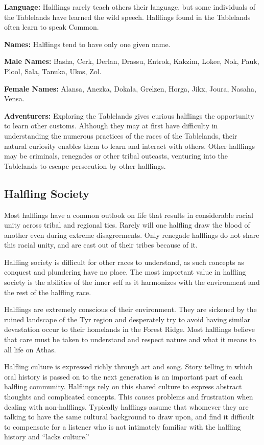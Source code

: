 \textbf{Language:} Halflings rarely teach others their language, but some individuals of the Tablelands have learned the wild speech. Halflings found in the Tablelands often learn to speak Common.

\textbf{Names:} Halflings tend to have only one given name.

\textbf{Male Names:} Basha, Cerk, Derlan, Drassu, Entrok, Kakzim, Lokee, Nok, Pauk, Plool, Sala, Tanuka, Ukos, Zol.

\textbf{Female Names:} Alansa, Anezka, Dokala, Grelzen, Horga, Jikx, Joura, Nasaha, Vensa.

\textbf{Adventurers:} Exploring the Tablelands gives curious halflings the opportunity to learn other customs. Although they may at first have difficulty in understanding the numerous practices of the races of the Tablelands, their natural curiosity enables them to learn and interact with others. Other halflings may be criminals, renegades or other tribal outcasts, venturing into the Tablelands to escape persecution by other halflings.

\subsection{Halfling Society}
Most halflings have a common outlook on life that results in considerable racial unity across tribal and regional ties. Rarely will one halfling draw the blood of another even during extreme disagreements. Only renegade halflings do not share this racial unity, and are cast out of their tribes because of it.

Halfling society is difficult for other races to understand, as such concepts as conquest and plundering have no place. The most important value in halfling society is the abilities of the inner self as it harmonizes with the environment and the rest of the halfling race.

Halflings are extremely conscious of their environment. They are sickened by the ruined landscape of the Tyr region and desperately try to avoid having similar devastation occur to their homelands in the Forest Ridge. Most halflings believe that care must be taken to understand and respect nature and what it means to all life on Athas.

Halfling culture is expressed richly through art and song. Story telling in which oral history is passed on to the next generation is an important part of each halfling community. Halflings rely on this shared culture to express abstract thoughts and complicated concepts. This causes problems and frustration when dealing with non-halflings. Typically halflings assume that whomever they are talking to have the same cultural background to draw upon, and find it difficult to compensate for a listener who is not intimately familiar with the halfling history and ``lacks culture.''

